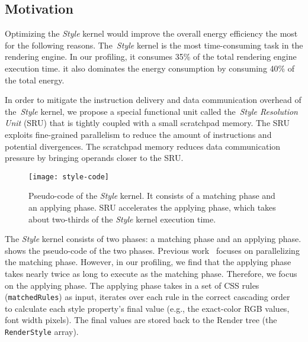
\subsection{Motivation}
\label{sec:sru:motivation}

Optimizing the \textit{Style} kernel would improve the overall energy efficiency the most for the following reasons. The~\textit{Style} kernel is the most time-consuming task in the rendering engine. In our profiling, it consumes 35\% of the total rendering engine execution time. it also dominates the energy consumption by consuming 40\% of the total energy.

In order to mitigate the instruction delivery and data communication overhead of the~\textit{Style} kernel, we propose a special functional unit called the~\textit{Style Resolution Unit} (SRU) that is tightly coupled with a small scratchpad memory. The SRU exploits fine-grained parallelism to reduce the amount of instructions and potential divergences. The scratchpad memory reduces data communication pressure by bringing operands closer to the SRU.

\begin{figure}[t]
\centering
\captionsetup{width=\columnwidth}
\texttt{[image: style-code]}
\caption{\small{Pseudo-code of the \textit{Style} kernel. It consists of a matching phase and an applying phase. SRU accelerates the applying phase, which takes about two-thirds of the \textit{Style} kernel execution time.}}
\label{fig:style-code}
\end{figure}

The \textit{Style} kernel consists of two phases: a matching phase and an applying phase.  shows the pseudo-code of the two phases. Previous work~\cite{zoomm,ParallelBrowser} focuses on parallelizing the matching phase. However, in our profiling, we find that the applying phase takes nearly twice as long to execute as the matching phase. Therefore, we focus on the applying phase. The applying phase takes in a set of CSS rules (\texttt{matchedRules}) as input, iterates over each rule in the correct cascading order~\cite{cascading} to calculate each style property's final value (e.g., the exact-color RGB values, font width pixels). The final values are stored back to the Render tree (the \texttt{RenderStyle} array).

